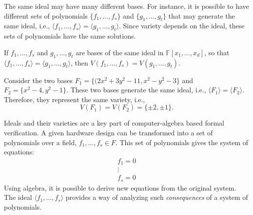 The same ideal may have many different bases.
For instance, it is possible to have different sets of polynomials
$\{f_1,\dots,f_{s}\}$ and $\{g_{1},\dots,g_{t}\}$ that may generate the same 
ideal, i.e., 
$\langle f_{1},\dots,f_{s}\rangle=\langle g_{1},\dots,g_{t}\rangle$. Since 
variety depends on the ideal, these sets of polynomials have the same 
solutions.

\begin{Proposition}
If $f_1,\dots,f_{s}$ and $g_{1},\dots,g_{t}$ are bases of the same ideal 
in $\mathbb{F}[x_{1},\dots,x_{d}]$,
so that $\langle f_{1},\dots,f_{s}\rangle=\langle g_{1},\dots,g_{t}\rangle$, 
then $V(f_{1},\dots,f_{s})=V(g_{1},\dots,g_{t})$.
\end{Proposition}

\begin{Example}
	Consider the two bases $F_{1}=\{(2x^{2}+3y^{2}-11,x^{2}-y^{2}-3\}$ and $F_{2}=\{x^{2}-4,y^{2}-1\}$.
	These two bases generate the same ideal, i.e., $\langle F_{1}\rangle= \langle F_{2} \rangle$.{}
	Therefore, they represent the same variety, i.e., 
	\begin{equation}
		V(F_{1})= V( F_{2})=\{\pm 2, \pm 1\}.
	\end{equation}
\end{Example}

Ideals and their varieties are a key part of computer-algebra based formal
verification. A given hardware design can be transformed into a set
of polynomials over a field, $f_1, \ldots, f_s \in F$.
This set of polynomials gives the system of equations:
\begin{eqnarray}
f_1 = 0 \nonumber \\
\vdots \nonumber \\
f_s = 0 \nonumber
\end{eqnarray}
Using algebra, it is possible to derive new equations from the original 
system.
The ideal $\langle f_1,\ldots, f_s \rangle$ provides a way of analyzing 
such {\it consequences} of a system of polynomials.

